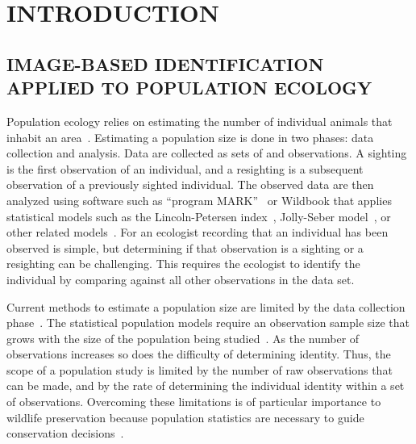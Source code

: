 \begin{comment}
    ./texfix.py --outline --fpaths chapter1-intro.tex

    fixtex --fpaths chapter1-intro.tex --outline --asmarkdown --numlines=999 --shortcite -w && ./checklang.py outline_chapter1-intro.md

    ./texfix.py --grep "\\\\[A-Za-z]*[^{a-zA-Z]"
    ./texfix.py --reformat --fpaths figdef1.tex
\end{comment}


\chapter{INTRODUCTION}\label{chap:intro}

\section{IMAGE-BASED IDENTIFICATION APPLIED TO POPULATION ECOLOGY}

    Population ecology relies on estimating the number of individual animals that inhabit an
      area~\cite{krebs_ecological_1999}.
    Estimating a population size is done in two phases:
    data collection and analysis.
    Data are collected as sets of  and  observations.
    A sighting is the first observation of an individual, and a resighting is a subsequent observation of a
      previously sighted individual.
    The observed data are then analyzed using software such as ``program MARK''~\cite{white_program_1999,
      schwarz_jolly_seber_2006} or Wildbook that applies statistical models such as the Lincoln-Petersen
      index~\cite{seber_estimation_1982}, Jolly-Seber model~\cite{jolly_explicit_1965, seber_note_1965}, or other
      related models~\cite{cormack_estimates_1964, chao_estimating_1987,kenneth._h._pollock_statistical_1990}.
    For an ecologist recording that an individual has been observed is simple, but determining if that
      observation is a sighting or a resighting can be challenging.
    This requires the ecologist to identify the individual by comparing against all other observations in the
      data set.

    Current methods to estimate a population size are limited by the data collection
    phase~\cite{sundaresan_network_2007, rubenstein_ecology_2010}. The statistical population models require an
    observation sample size that grows with the size of the population being studied~\cite{seber_estimation_1982}.
    As the number of observations increases so does the difficulty of determining identity. Thus, the scope of a
    population study is limited by the number of raw observations that can be made, and by the rate of determining
    the individual identity within a set of observations. Overcoming these limitations is of particular importance
    to wildlife preservation because population statistics are necessary to guide conservation
    decisions~\cite{rubenstein_behavioral_1998}.

